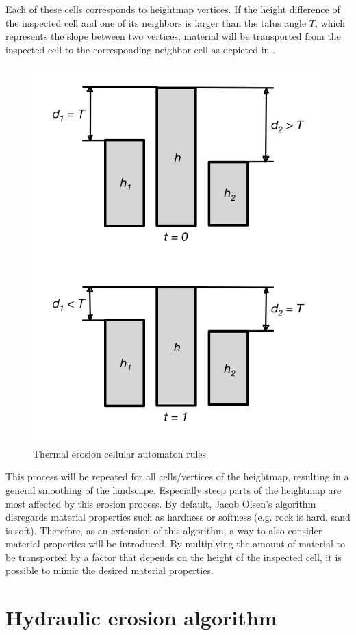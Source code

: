 \documentclass[11pt,a4paper,twoside,openright]{report}
\begin{document}
\noindent Each of these cells corresponds to heightmap vertices. If the height difference of the inspected cell and one of its neighbors is larger than the talus angle $T$, which represents the slope between two vertices, material will be transported from the inspected cell to the corresponding neighbor cell as depicted in .

\begin{figure}[H]
\centering
\includegraphics[width=0.4\linewidth]{thermalerosion.png}
\caption{Thermal erosion cellular automaton rules}\label{fig:thermalerosion}
\end{figure}

\noindent This process will be repeated for all cells/vertices of the heightmap, resulting in a general smoothing of the landscape. Especially steep parts of the heightmap are most affected by this erosion process. By default, Jacob Olsen's algorithm disregards material properties such as hardness or softness (e.g. rock is hard, sand is soft). Therefore, as an extension of this algorithm, a way to also consider material properties will be introduced. By multiplying the amount of material to be transported by a factor that depends on the height of the inspected cell, it is possible to mimic the desired material properties.

\section{Hydraulic erosion algorithm}
\label{sec:hydraulicerosion}
\end{document}
